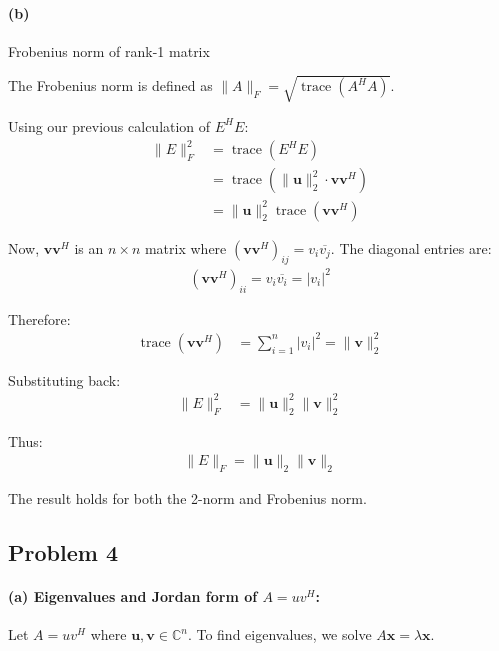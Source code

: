 \paragraph{(b)} Frobenius norm of rank-1 matrix

The Frobenius norm is defined as $\|A\|_F = \sqrt{\operatorname{trace}(A^H A)}$.

Using our previous calculation of $E^H E$:
\begin{align*}
    \|E\|_F^2 & = \operatorname{trace}(E^H E)                                            \\
              & = \operatorname{trace}(\|\mathbf{u}\|_2^2 \cdot \mathbf{v} \mathbf{v}^H) \\
              & = \|\mathbf{u}\|_2^2 \operatorname{trace}(\mathbf{v} \mathbf{v}^H)
\end{align*}

Now, $\mathbf{v} \mathbf{v}^H$ is an $n \times n$ matrix where $(\mathbf{v} \mathbf{v}^H)_{ij} = v_i \overline{v_j}$. The diagonal entries are:
\begin{align*}
    (\mathbf{v} \mathbf{v}^H)_{ii} = v_i \overline{v_i} = |v_i|^2
\end{align*}

Therefore:
\begin{align*}
    \operatorname{trace}(\mathbf{v} \mathbf{v}^H) & = \sum_{i=1}^n |v_i|^2 = \|\mathbf{v}\|_2^2
\end{align*}

Substituting back:
\begin{align*}
    \|E\|_F^2 & = \|\mathbf{u}\|_2^2 \|\mathbf{v}\|_2^2
\end{align*}

Thus:
\begin{align*}
    \|E\|_F = \|\mathbf{u}\|_2 \|\mathbf{v}\|_2
\end{align*}

The result holds for both the 2-norm and Frobenius norm.

\subsection{Problem 4}

\paragraph{(a) Eigenvalues and Jordan form of $A = uv^H$:}
Let $A = uv^H$ where $\mathbf{u}, \mathbf{v} \in \mathbb{C}^n$.
To find eigenvalues, we solve $A\mathbf{x} = \lambda \mathbf{x}$.

